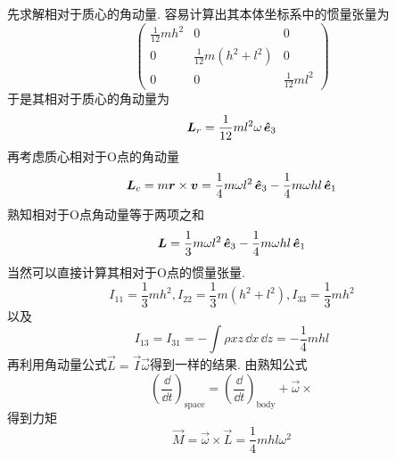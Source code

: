 \begin{solution}
    先求解相对于质心的角动量. 
    容易计算出其本体坐标系中的惯量张量为
    $$\begin{pmatrix}
        \frac{1}{12}mh^2&0&0\\0&\frac{1}{12}m(h^2+l^2)&0\\0&0&\frac{1}{12}ml^2
    \end{pmatrix}$$
    于是其相对于质心的角动量为
    $$\boldsymbol{L}_r=\frac{1}{12}ml^2\omega \,\boldsymbol{\hat{e}}_3$$
    再考虑质心相对于O点的角动量
    $$\boldsymbol{L}_c=m\boldsymbol{r}\times\boldsymbol{v}=\frac14m\omega l^2\,\boldsymbol{\hat{e}}_3-\frac14m\omega hl\,\boldsymbol{\hat{e}}_1$$
    熟知相对于O点角动量等于两项之和
    $$\boldsymbol{L}=\frac13m\omega l^2\,\boldsymbol{\hat{e}}_3-\frac14m\omega hl\,\boldsymbol{\hat{e}}_1$$
    当然可以直接计算其相对于O点的惯量张量. 
    $$I_{11}=\frac13mh^2,I_{22}=\frac13m(h^2+l^2),I_{33}=\frac13mh^2$$
    以及
    $$I_{13}=I_{31}=-\int\rho xz\,\dd x\,\dd z=-\frac14mhl$$
    再利用角动量公式$\vec{L}=\vec{I}\vec{\omega}$得到一样的结果. 
    由熟知公式
    $$\left(\frac{\dd}{\dd t}\right)_{\mathrm{space}}=\left(\frac{\dd}{\dd t}\right)_{\mathrm{body}}+\vec{\omega}\times$$
    得到力矩
    $$\vec{M}=\vec{\omega}\times\vec{L}=\frac14mhl\omega^2$$
\end{solution}

